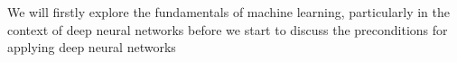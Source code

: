 We will firstly explore the fundamentals of machine learning, particularly in the context of deep neural networks before we start to discuss the preconditions for applying deep neural networks 